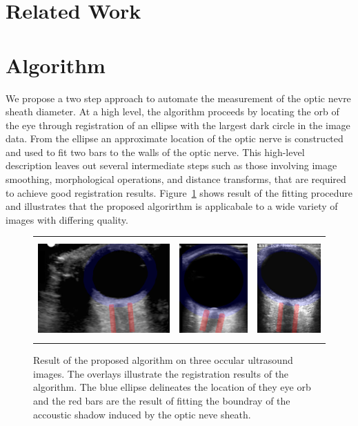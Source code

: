 \documentclass{llncs}
\begin{document}
\section{Related Work}


\section{Algorithm}
We propose a two step approach to automate the measurement of the optic nevre
sheath diameter. At a high level, the algorithm proceeds by locating the orb of
the eye through registration of an ellipse with the largest dark circle in the
image data. From the ellipse an approximate location of the optic nerve is
constructed and used to fit two bars to the walls of the optic nerve. This
high-level description leaves out several intermediate steps such as those
involving image smoothing, morphological operations, and distance transforms,
that are required to achieve good registration results. Figure~\ref{fig:fitted}
shows result of the fitting procedure and illustrates that the proposed
algorirthm is applicabale to a wide variety of images with differing quality.
\begin{figure}
\centering
\begin{tabular}{ccc}
\includegraphics[height=1.5in]{003-overlay.png} &
\includegraphics[height=1.5in]{009-overlay.png} &
\includegraphics[height=1.5in]{023-overlay.png} 
\end{tabular}
\caption{
\label{fig:fitted}
Result of the proposed algorithm on three occular ultrasound images. The
overlays illustrate the registration results of the algorithm. The blue ellipse
delineates the location of they eye orb and the red bars are the result of
fitting the boundray of the accoustic shadow induced by the optic neve sheath.
}
\end{figure}
\end{document}
